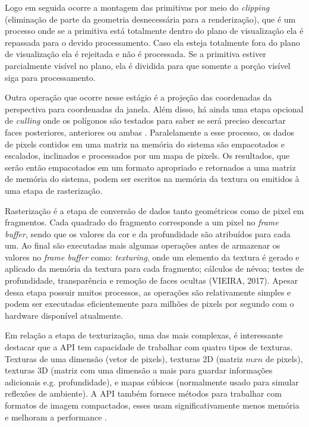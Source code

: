 Logo em seguida ocorre a montagem das primitivas por meio do \textit{clipping} (eliminação de parte da geometria desnecessária para a renderização), que é um processo onde se a primitiva está totalmente dentro do plano de visualização ela é repassada para o devido processamento. Caso ela esteja totalmente fora do plano de visualização ela é rejeitada e não é processada. Se a primitiva estiver parcialmente visível no plano, ela é dividida para que somente a porção visível siga para processamento.

Outra operação que ocorre nesse estágio é a projeção das coordenadas da perspectiva para coordenadas da janela. Além disso, há ainda uma etapa opcional de \textit{culling} onde os polígonos são testados para saber se será preciso descartar faces posteriores, anteriores ou ambas \cite{GLSLBook}. Paralelamente a esse processo, os dados de pixels contidos em uma matriz na memória do sistema são empacotados e escalados, inclinados e processados por um mapa de pixels. Os resultados, que serão então empacotados em um formato apropriado e retornados a uma matriz de memória do sistema, podem ser escritos na memória da textura ou emitidos à uma etapa de rasterização.

Rasterização é a etapa de conversão de dados tanto geométricos como de pixel em fragmentos. Cada quadrado do fragmento corresponde a um pixel no \textit{frame buffer}, sendo que os valores da cor e da profundidade são atribuídos para cada um. Ao final são executadas mais algumas operações antes de armazenar os valores no \textit{frame buffer} como: \textit{texturing}, onde um elemento da textura é gerado e aplicado da memória da textura para cada fragmento; cálculos de névoa; testes de profundidade, transparência e remoção de faces ocultas (VIEIRA, 2017). Apesar dessa etapa possuir muitos processos, as operações são relativamente simples e podem ser executadas eficientemente para milhões de pixels por segundo com o hardware disponível atualmente.

Em relação a etapa de texturização, uma das mais complexas, é interessante destacar que a API tem capacidade de trabalhar com quatro tipos de texturas. Texturas de uma dimensão (vetor de pixels), texturas 2D (matriz $ mxn $ de pixels), texturas 3D (matriz com uma dimensão a mais para guardar informações adicionais e.g. profundidade), e mapas cúbicos (normalmente usado para simular reflexões de ambiente). A API também fornece métodos para trabalhar com formatos de imagem compactados, esses usam significativamente menos memória e melhoram a performance \cite{GLSLBook}.


